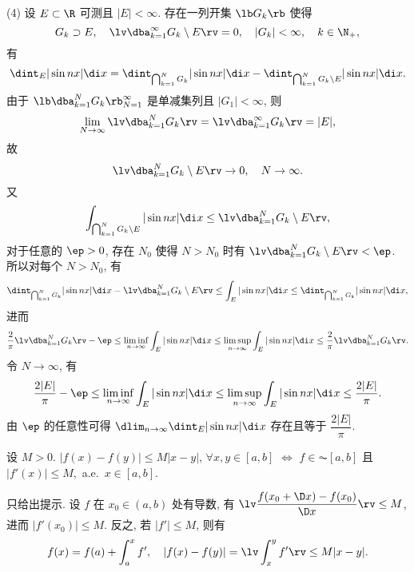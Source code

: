 \documentclass[UTF8, a4paper, 12pt, twoside, onecolumn]{book}
\begin{document}
\begin{Solve}
	(4) 设 $E \subset \R$ 可测且 $|E| < \infty$. 存在一列开集 $\lb G_k \rb$ 使得
	$$G_k \supset E,\quad \lv \dba_{k = 1}^\infty G_k \setminus E \rv = 0,\quad |G_k| < \infty,\quad k \in \N_+,$$
	有
	$$\dint_E|\sin nx|\di x = \dint_{\bigcap_{k = 1}^N G_k} |\sin nx| \di x - \dint_{\bigcap_{k = 1}^N G_k \setminus E} |\sin nx| \di x.$$
	由于 $\lb \dba_{k = 1}^N G_k \rb_{N = 1}^\infty$ 是单减集列且 $|G_1| < \infty$, 则
	$$\lim_{N \to \infty} \lv \dba_{k = 1}^N G_k \rv = \lv \dba_{k = 1}^\infty G_k \rv = |E|,$$
	故
	$$\lv \dba_{k = 1}^N G_k \setminus E \rv \to 0,\quad N \to \infty.$$
	又
	$$\int_{\bigcap_{k = 1}^N G_k \setminus E} |\sin nx| \di x \leq \lv \dba_{k = 1}^N G_k \setminus E \rv,$$
	对于任意的 $\ep > 0$, 存在 $N_0$ 使得 $N > N_0$ 时有 $\lv \dba_{k = 1}^N G_k \setminus E \rv < \ep$. 所以对每个 $N > N_0$, 有
	$$\dint_{\bigcap_{k = 1}^N G_k} |\sin nx| \di x - \lv \dba_{k = 1}^N G_k \setminus E \rv \leq \int_E |\sin nx| \di x \leq \dint_{\bigcap_{k = 1}^N G_k} |\sin nx| \di x,$$
	进而
	$$\dfrac{2}{\pi}\lv\dba_{k = 1}^N G_k \rv - \ep \leq \liminf_{n \to \infty} \int_E |\sin nx| \di x \leq \limsup_{n \to \infty} \int_E |\sin nx| \di x \leq \dfrac{2}{\pi}\lv\dba_{k = 1}^N G_k \rv.$$
	令 $N \to \infty$, 有
	$$\dfrac{2|E|}{\pi} - \ep \leq \liminf_{n \to \infty} \int_E |\sin nx| \di x \leq \limsup_{n \to \infty} \int_E |\sin nx| \di x \leq \dfrac{2|E|}{\pi}.$$
	由 $\ep$ 的任意性可得 $\dlim_{n \to \infty} \dint_E |\sin nx| \di x$ 存在且等于 $\dfrac{2|E|}{\pi}$.
\end{Solve}

\begin{Example}
	设 $M > 0$. $|f(x) - f(y)| \leq M|x - y|$, $\forall x, y \in [a, b]$ $\Leftrightarrow$ $f \in \AC[a, b]$ 且 $|f'(x)| \leq M$,~a.e.~$x \in [a, b]$.
\end{Example}

\begin{Proof}
	只给出提示. 设 $f$ 在 $x_0 \in (a, b)$ 处有导数, 有 $\lv\dfrac{f(x_0 + \D x) - f(x_0)}{\D x}\rv \leq M$, 进而 $|f'(x_0)| \leq M$. 反之, 若 $|f'| \leq M$, 则有
	\begin{align*}
		f(x) = f(a) + \int_a^x f',\quad |f(x) - f(y)| = \lv \int_x^y f' \rv \leq M|x - y|.
	\end{align*}
\end{Proof}
\end{document}

